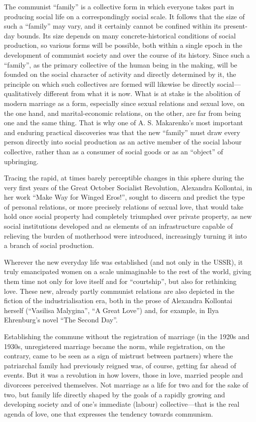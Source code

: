 \documentclass[12pt,a4paper,openany]{book}
\begin{document}
The communist “family” is a collective form in which everyone takes part in producing social life on a correspondingly social scale. It follows that the size of such a “family” may vary, and it certainly cannot be confined within its present-day bounds. Its size depends on many concrete-historical conditions of social production, so various forms will be possible, both within a single epoch in the development of communist society and over the course of its history. Since such a “family”, as the primary collective of the human being in the making, will be founded on the social character of activity and directly determined by it, the principle on which such collectives are formed will likewise be directly social—qualitatively different from what it is now. What is at stake is the abolition of modern marriage as a form, especially since sexual relations and sexual love, on the one hand, and marital-economic relations, on the other, are far from being one and the same thing. That is why one of A. S. Makarenko’s most important and enduring practical discoveries was that the new “family” must draw every person directly into social production as an active member of the social labour collective, rather than as a consumer of social goods or as an “object” of upbringing.

Tracing the rapid, at times barely perceptible changes in this sphere during the very first years of the Great October Socialist Revolution, Alexandra Kollontai, in her work “Make Way for Winged Eros!”, sought to discern and predict the type of personal relations, or more precisely relations of sexual love, that would take hold once social property had completely triumphed over private property, as new social institutions developed and as elements of an infrastructure capable of relieving the burden of motherhood were introduced, increasingly turning it into a branch of social production.

Wherever the new everyday life was established (and not only in the USSR), it truly emancipated women on a scale unimaginable to the rest of the world, giving them time not only for love itself and for “courtship”, but also for rethinking love. These new, already partly communist relations are also depicted in the fiction of the industrialisation era, both in the prose of Alexandra Kollontai herself (“Vasilisa Malygina”, “A Great Love”) and, for example, in Ilya Ehrenburg’s novel “The Second Day”.

Establishing the commune without the registration of marriage (in the 1920s and 1930s, unregistered marriage became the norm, while registration, on the contrary, came to be seen as a sign of mistrust between partners) where the patriarchal family had previously reigned was, of course, getting far ahead of events. But it was a revolution in how lovers, those in love, married people and divorcees perceived themselves. Not marriage as a life for two and for the sake of two, but family life directly shaped by the goals of a rapidly growing and developing society and of one’s immediate (labour) collective—that is the real agenda of love, one that expresses the tendency towards communism.
\end{document}
